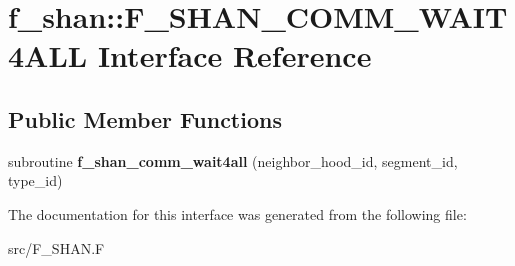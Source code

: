 \hypertarget{interfacef__shan_1_1F__SHAN__COMM__WAIT4ALL}{}\section{f\+\_\+shan\+:\+:F\+\_\+\+S\+H\+A\+N\+\_\+\+C\+O\+M\+M\+\_\+\+W\+A\+I\+T4\+A\+LL Interface Reference}
\label{interfacef__shan_1_1F__SHAN__COMM__WAIT4ALL}
\subsection*{Public Member Functions}
\begin{DoxyCompactItemize}
\item 
subroutine {\bfseries f\+\_\+shan\+\_\+comm\+\_\+wait4all} (neighbor\+\_\+hood\+\_\+id, segment\+\_\+id, type\+\_\+id)\hypertarget{interfacef__shan_1_1F__SHAN__COMM__WAIT4ALL_adf183a4f63be0fb29ae7dd40dfea5211}{}\label{interfacef__shan_1_1F__SHAN__COMM__WAIT4ALL_adf183a4f63be0fb29ae7dd40dfea5211}

\end{DoxyCompactItemize}


The documentation for this interface was generated from the following file\+:\begin{DoxyCompactItemize}
\item 
src/F\+\_\+\+S\+H\+A\+N.\+F\end{DoxyCompactItemize}
